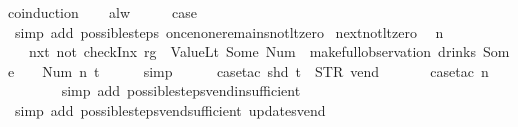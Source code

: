 \begin{isabellebody}
%
\isadelimproof
%
\endisadelimproof
%
\isatagproof
{}\isamarkupfalse%
{\isacharparenleft}coinduction{\isacharparenright}\isanewline
\ \ \isamarkupfalse%
\ alw\isanewline
\ \ \isamarkupfalse%
\ \isamarkupfalse%
\ {\isacharquery}case\isanewline
\ \ \ \ \isamarkupfalse%
\ {\isacharparenleft}simp\ add{\isacharcolon}\ possible{\isacharunderscore}steps{\isacharunderscore}{}\ once{\isacharunderscore}none{\isacharunderscore}remains{\isacharunderscore}not{\isacharunderscore}lt{\isacharunderscore}zero{\isacharparenright}\isanewline
{}\isamarkupfalse%
%
\endisatagproof
{\isafoldproof}%
%
\isadelimproof
\isanewline
%
\endisadelimproof
\isanewline
{}\isamarkupfalse%
\ next{\isacharunderscore}not{\isacharunderscore}lt{\isacharunderscore}zero{\isacharcolon}\isanewline
\ \ {\isachardoublequoteopen}n\ {\isasymge}\ {}\ {\isasymLongrightarrow}\isanewline
\ \ \ {\isacharparenleft}nxt\ {\isacharparenleft}not\ {\isacharparenleft}checkInx\ rg\ {}\ ValueLt\ {\isacharparenleft}Some\ {\isacharparenleft}Num\ {}{\isacharparenright}{\isacharparenright}{\isacharparenright}{\isacharparenright}{\isacharparenright}\ {\isacharparenleft}make{\isacharunderscore}full{\isacharunderscore}observation\ drinks\ {\isacharparenleft}Some\ {}{\isacharparenright}\ {\isacharparenleft}{\isacharless}{\isachargreater}{\isacharparenleft}{}\ {\isacharcolon}{\isacharequal}\ Num\ n{\isacharparenright}{\isacharparenright}\ t{\isacharparenright}{\isachardoublequoteclose}\isanewline
%
\isadelimproof
\ \ \ \ %
\endisadelimproof
%
\isatagproof
{}\isamarkupfalse%
\ simp\isanewline
\ \ \ \ \isamarkupfalse%
\ {\isacharparenleft}case{\isacharunderscore}tac\ {\isachardoublequoteopen}shd\ t\ {\isacharequal}\ {\isacharparenleft}STR\ {\isacharprime}{\isacharprime}vend{\isacharprime}{\isacharprime}{\isacharcomma}\ {\isacharbrackleft}{\isacharbrackright}{\isacharparenright}{\isachardoublequoteclose}{\isacharparenright}\isanewline
\ \ \ \ \isamarkupfalse%
\ {\isacharparenleft}case{\isacharunderscore}tac\ {\isachardoublequoteopen}n\ {\isacharequal}\ {}{\isachardoublequoteclose}{\isacharparenright}\isanewline
\ \ \ \ \ \ \isamarkupfalse%
\ {\isacharparenleft}simp\ add{\isacharcolon}\ possible{\isacharunderscore}steps{\isacharunderscore}vend{\isacharunderscore}insufficient{\isacharparenright}\isanewline
\ \ \ \ \ \isamarkupfalse%
\ {\isacharparenleft}simp\ add{\isacharcolon}\ possible{\isacharunderscore}steps{\isacharunderscore}vend{\isacharunderscore}sufficient\ updates{\isacharunderscore}vend{\isacharparenright}\isanewline

\end{isabellebody}

